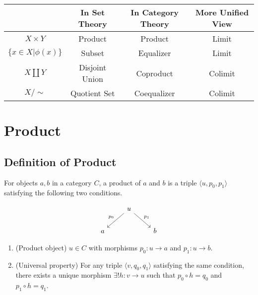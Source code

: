 \documentclass[uplatex,a4j,12pt,dvipdfmx]{jsarticle}
\begin{document}
\begin{table}[H]
	\centering
	\begin{tabular}{c|c|c|c}
		                          & In Set Theory  & In Category Theory & More Unified View \\ \hline \hline
		$X \times Y$              & Product        & Product            & Limit             \\ \hline
		$\{ x \in X | \phi(x) \}$ & Subset         & Equalizer          & Limit             \\ \hline
		$X \coprod Y$             & Disjoint Union & Coproduct          & Colimit           \\ \hline
		$X / \sim$                & Quotient Set   & Coequalizer        & Colimit           \\ \hline
	\end{tabular}
\end{table}


\section{Product}

\subsection{Definition of Product}

For objects $a,b$ in a category $C$, a product of $a$ and $b$ is a triple $\langle u,p_{0},p_{1} \rangle$ satisfying the following two conditions.

\[
	\begin{tikzcd}
		& u \arrow[ld, "p_{0}"'] \arrow[rd, "p_{1}"] & \\
		a && b
	\end{tikzcd}
\]

\begin{enumerate}
	\item (Product object) $u \in C$ with morphisms $p_{0} : u \to a$ and $p_{1} : u \to b$.
	\item (Universal property) For any triple $\langle v,q_{0},q_{1} \rangle$ satisfying the same condition, there exists a unique morphism $\exists ! h: v \to u$ such that $p_{0} \circ h = q_{0}$ and $p_{1} \circ h = q_{1}$.
\end{enumerate}
\end{document}
